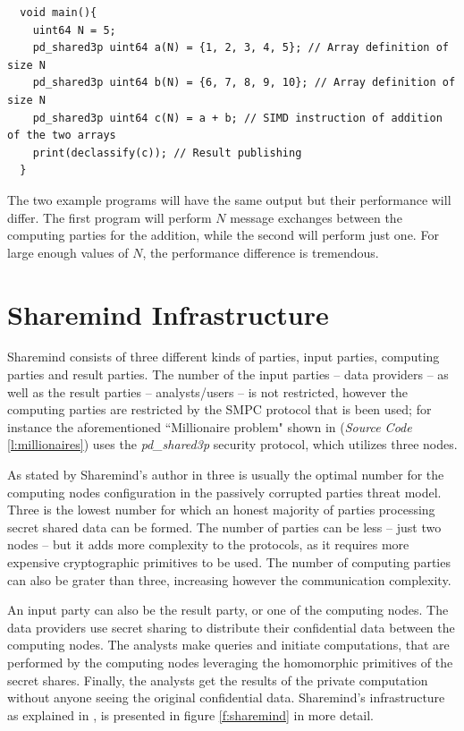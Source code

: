 {
\begin{verbatim}
  void main(){
    uint64 N = 5;
    pd_shared3p uint64 a(N) = {1, 2, 3, 4, 5}; // Array definition of size N
    pd_shared3p uint64 b(N) = {6, 7, 8, 9, 10}; // Array definition of size N
    pd_shared3p uint64 c(N) = a + b; // SIMD instruction of addition of the two arrays
    print(declassify(c)); // Result publishing
  }
\end{verbatim}
\label{l:vectorized_addition}
}

The two example programs will have the same output but their performance will differ.
The first program will perform $N$ message exchanges between the computing parties for the addition, while the second will perform just one.
For large enough values of $N$, the performance difference is tremendous.



\section{Sharemind Infrastructure}\label{sharemind-infrastructure}
Sharemind consists of three different kinds of parties, input parties, computing parties and result parties.
The number of the input parties -- data providers -- as well as the result parties -- analysts/users -- is not restricted, however the computing parties are restricted by the SMPC protocol that is been used; for instance the aforementioned ``Millionaire problem" shown in (\textit{Source Code} \ref{l:millionaires}) uses the \textit{pd\_shared3p} security protocol, which utilizes three nodes.

As stated by Sharemind's author in \cite{bogdanov2013sharemind} three is usually the optimal number for the computing nodes configuration in the passively corrupted parties threat model.
Three is the lowest number for which an honest majority of parties processing secret shared data can be formed.
The number of parties can be less -- just two nodes -- but it adds more complexity to the protocols, as it requires more expensive cryptographic primitives to be used.
The number of computing parties can also be grater than three, increasing however the communication complexity.

An input party can also be the result party, or one of the computing nodes.
The data providers use secret sharing to distribute their confidential data between the computing nodes.
The analysts make queries and initiate computations, that are performed by the computing nodes leveraging the homomorphic primitives of the secret shares.
Finally, the analysts get the results of the private computation without anyone seeing the original confidential data.
Sharemind's infrastructure as explained in \cite{turban2014secure}, is presented in figure \ref{f:sharemind} in more detail.


